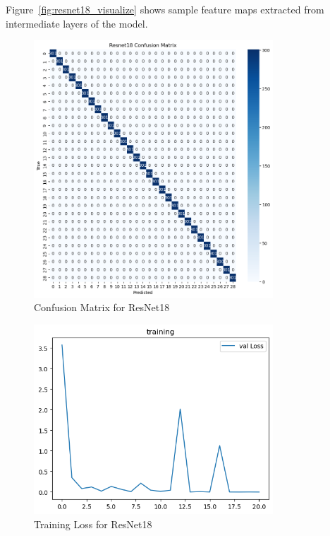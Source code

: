 \documentclass[12pt, a4paper]{article}
\begin{document}
Figure~\ref{fig:resnet18_visualize} shows sample feature maps extracted from intermediate layers of the model.
\begin{figure}[H]
    \centering
    \includegraphics[width=0.8\textwidth]{../../plots/ResNet18_ConfusionMatrix.png}
    \caption{Confusion Matrix for ResNet18}
    \label{fig:resnet18_confusion_matrix}
\end{figure}
\begin{figure}[H]
    \centering
    \includegraphics[width=0.8\textwidth]{../../plots/ResNet18_training.png}
    \caption{Training Loss for ResNet18}
    \label{fig:resnet18_training_loss}
\end{figure}


\end{document}
